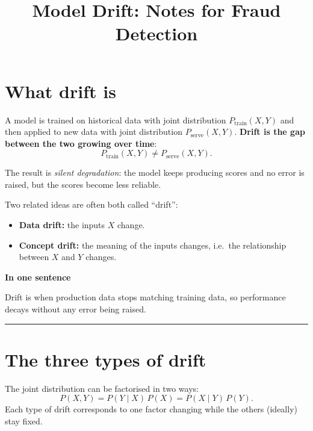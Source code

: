 \documentclass[11pt]{article}
\title{Model Drift: Notes for Fraud Detection}
\author{}
\date{}
\begin{document}
\maketitle

\section{What drift is}

A model is trained on historical data with joint distribution \(P_{\text{train}}(X,Y)\) and then applied to new data with joint distribution \(P_{\text{serve}}(X,Y)\). \textbf{Drift is the gap between the two growing over time}:
\[
P_{\text{train}}(X,Y)\neq P_{\text{serve}}(X,Y).
\]

The result is \emph{silent degradation}: the model keeps producing scores and no error is raised, but the scores become less reliable.

Two related ideas are often both called ``drift'':
\begin{itemize}
    \item \textbf{Data drift:} the inputs \(X\) change.
    \item \textbf{Concept drift:} the meaning of the inputs changes, i.e.\ the relationship between \(X\) and \(Y\) changes.
\end{itemize}

\textbf{In one sentence}

Drift is when production data stops matching training data, so performance decays without any error being raised.

\vspace{5mm}
\hrule
\vspace{5mm}

\section{The three types of drift}

The joint distribution can be factorised in two ways:
\[
P(X,Y)=P(Y\mid X)\,P(X)=P(X\mid Y)\,P(Y).
\]
Each type of drift corresponds to one factor changing while the others (ideally) stay fixed.
\end{document}
